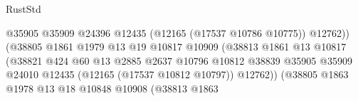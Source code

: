 \begin{lexlean}{RustStd}
\begin{coremodule}
                                                        @35905
                                                        @35909
                                                        @24396
                                                        @12435
                                                        (@12165 (@17537 @10786 @10775))
                                                        @12762))
                                                    (@38805
                                                      @1861
                                                      @1979
                                                      @13
                                                      @19
                                                      @10817
                                                      @10909
                                                      (@38813
                                                        @1861
                                                        @13
                                                        @10817
                                                        (@38821
                                                          @424
                                                          @60
                                                          @13
                                                          @2885
                                                          @2637
                                                          @10796
                                                          @10812
                                                          @38839
                                                          @35905
                                                          @35909
                                                          @24010
                                                          @12435
                                                          (@12165 (@17537 @10812 @10797))
                                                          @12762))
                                                      (@38805
                                                        @1863
                                                        @1978
                                                        @13
                                                        @18
                                                        @10848
                                                        @10908
                                                        (@38813
                                                          @1863

\end{coremodule}
\end{lexlean}
